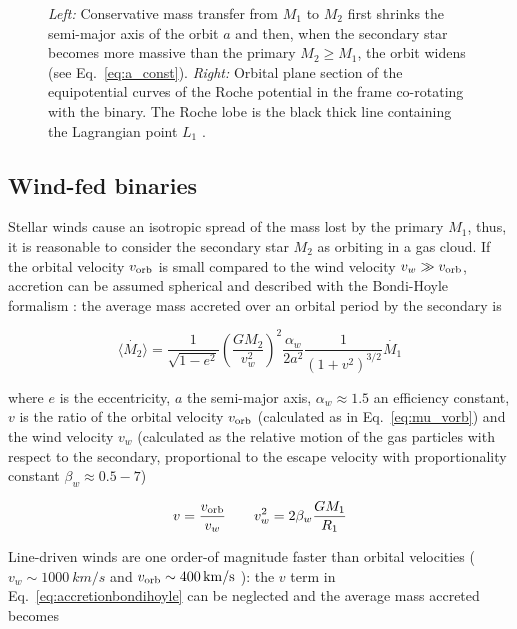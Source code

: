 \documentclass[a4paper,titlepage]{book}     	%
\begin{document}
\begin{figure}[h]
\begin{minipage}{.44\textwidth}
	\end{minipage}
	\caption{\emph{Left:} Conservative mass transfer from $M_1$ to $M_2$ first shrinks the semi-major axis of the orbit $a$ and then, when the secondary star becomes more massive than the primary $M_2 \geq M_1$, the orbit widens (see Eq.\ \ref{eq:a_const}). \emph{Right:} Orbital plane section of the equipotential curves of the Roche potential in the frame co-rotating with the binary. The Roche lobe is the black thick line containing the Lagrangian point $L_1$ \cite{tauris_evo_binaria}.}\label{fig:masstransferRochelobe}
\end{figure}

\subsection{Wind-fed binaries}\label{subsec:windfed}
Stellar winds cause an isotropic spread of the mass lost by the primary $M_1$, thus, it is reasonable to consider the secondary star $M_2$ as orbiting in a gas cloud. If the orbital velocity $v_{\rm orb}$ is small compared to the wind velocity $v_w \gg v_{\rm orb}$, accretion can be assumed spherical and described with the Bondi-Hoyle formalism \cite{BondiHoyle1944}: the average mass accreted over an orbital period by the secondary is

\begin{equation}\label{eq:accretionbondihoyle}
\langle \dot{M_2} \rangle = \frac{1}{\sqrt{1-e^2}} \left(\frac{G M_2}{v_w^2}\right)^2 \frac{\alpha_w}{2 a^2} \frac{1}{\left(1+v^2\right)^{3/2}} \dot{M_1}
\end{equation}

where $e$ is the eccentricity, $a$ the semi-major axis, $\alpha_w \approx 1.5$ an efficiency constant, $v$ is the ratio of the orbital velocity $v_{\rm orb}$ (calculated as in Eq.\ \ref{eq:mu_vorb}) and the wind velocity $v_w$ (calculated as the relative motion of the gas particles with respect to the secondary, proportional to the escape velocity with proportionality constant $\beta_w \approx 0.5-7$)

\begin{equation}
v = \frac{v_\textup{orb}}{v_w} \quad \quad v_w^2=2\beta_w \frac{G M_1}{R_1}
\end{equation}

Line-driven winds are one order-of magnitude faster than orbital velocities ($v_w \sim \SI{1000}{km/s}$ and $v_{\rm orb} \sim \SI{400}{km/s}$ \cite{CygX-3_Koljonen2017}): the $v$ term in Eq.\ \ref{eq:accretionbondihoyle} can be neglected and the average mass accreted becomes
\end{document}
